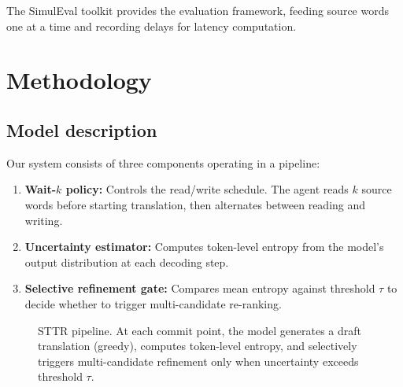 The SimulEval toolkit \citep{ma2020simuleval} provides the evaluation framework, feeding source words one at a time and recording delays for latency computation.

\section{Methodology}

\subsection{Model description}

Our system consists of three components operating in a pipeline:

\begin{enumerate}[leftmargin=*]
    \item \textbf{Wait-$k$ policy:} Controls the read/write schedule. The agent reads $k$ source words before starting translation, then alternates between reading and writing.
    \item \textbf{Uncertainty estimator:} Computes token-level entropy from the model's output distribution at each decoding step.
    \item \textbf{Selective refinement gate:} Compares mean entropy against threshold $\tau$ to decide whether to trigger multi-candidate re-ranking.
\end{enumerate}

\begin{figure}[h]
\centering
{}
\caption{STTR pipeline. At each commit point, the model generates a draft translation (greedy), computes token-level entropy, and selectively triggers multi-candidate refinement only when uncertainty exceeds threshold $\tau$.}
\label{fig:pipeline}
\end{figure}

